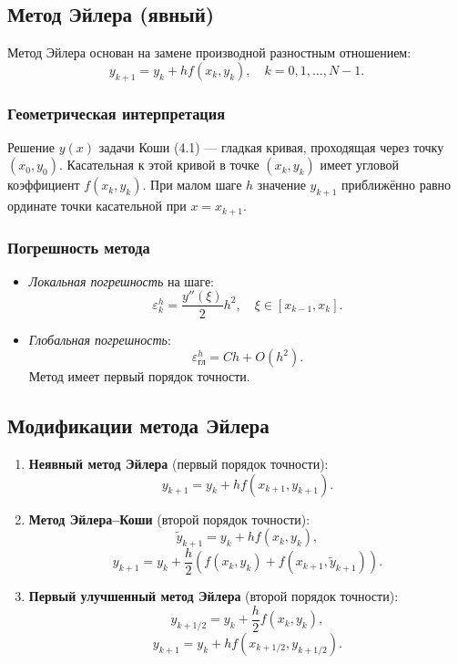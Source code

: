 \subsection{Метод Эйлера (явный)}
Метод Эйлера основан на замене производной разностным отношением:
\[
    y_{k+1} = y_k + h f(x_k, y_k), \quad k = 0, 1, \dots, N-1.
    \tag{4.2}
\]

\subsubsection{Геометрическая интерпретация}
Решение \( y(x) \) задачи Коши (4.1) — гладкая кривая, проходящая через точку \( (x_0, y_0) \). Касательная к этой кривой в точке \( (x_k, y_k) \) имеет угловой коэффициент \( f(x_k, y_k) \). При малом шаге \( h \) значение \( y_{k+1} \) приближённо равно ординате точки касательной при \( x = x_{k+1} \).

\subsubsection{Погрешность метода}
\begin{itemize}
    \item \textit{Локальная погрешность} на шаге:
    \[
        \varepsilon_k^h = \frac{y''(\xi)}{2} h^2, \quad \xi \in [x_{k-1}, x_k].
    \]
    \item \textit{Глобальная погрешность}:
    \[
        \varepsilon_{\text{гл}}^h = C h + O(h^2).
    \]
    Метод имеет первый порядок точности.
\end{itemize}

\subsection{Модификации метода Эйлера}
\begin{enumerate}
    \item \textbf{Неявный метод Эйлера} (первый порядок точности):
    \[
        y_{k+1} = y_k + h f(x_{k+1}, y_{k+1}).
        \tag{4.3}
    \]
    
    \item \textbf{Метод Эйлера–Коши} (второй порядок точности):
    \[
        \widetilde{y}_{k+1} = y_k + h f(x_k, y_k),
    \]
    \[
        y_{k+1} = y_k + \frac{h}{2} \left( f(x_k, y_k) + f(x_{k+1}, \widetilde{y}_{k+1}) \right).
        \tag{4.4}
    \]
    
    \item \textbf{Первый улучшенный метод Эйлера} (второй порядок точности):
    \[
        y_{k+1/2} = y_k + \frac{h}{2} f(x_k, y_k),
    \]
    \[
        y_{k+1} = y_k + h f(x_{k+1/2}, y_{k+1/2}).
        \tag{4.7}
    \]
\end{enumerate}

